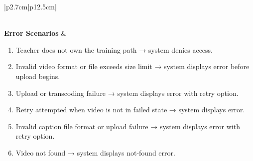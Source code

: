 \begin{table}[H]
\begin{tabular}{|p{2.7cm}|p{12.5cm}|}
\begin{minipage}[t]{\linewidth}
\begin{enumerate}[topsep=0pt,itemsep=1pt,parsep=0pt,partopsep=0pt]
            \end{enumerate}
        \end{minipage} \\
        \hline
        \textbf{Error Scenarios} &
        \begin{minipage}[t]{\linewidth}
            \begin{enumerate}[topsep=0pt,itemsep=1pt,parsep=0pt,partopsep=0pt]
                \item Teacher does not own the training path → system denies access.
                \item Invalid video format or file exceeds size limit → system displays error before upload begins.
                \item Upload or transcoding failure → system displays error with retry option.
                \item Retry attempted when video is not in failed state → system displays error.
                \item Invalid caption file format or upload failure → system displays error with retry option.
                \item Video not found → system displays not-found error.
            \end{enumerate}
        \end{minipage} \\
        \hline
    \end{tabular}
    \label{tab:teacher-manage-video}
\end{table}


